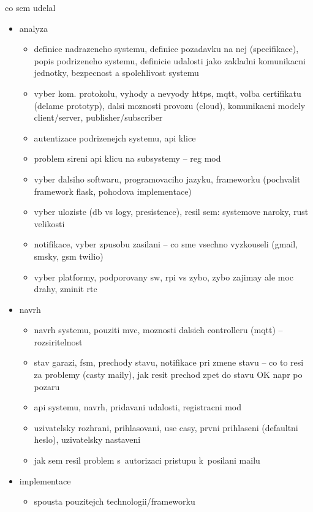 co sem udelal

\begin{itemize}
    \item analyza
    \begin{itemize}
    \item definice nadrazeneho systemu, definice pozadavku na nej (specifikace), popis podrizeneho systemu, definicie udalosti jako zakladni komunikacni jednotky, bezpecnost a spolehlivost systemu
    \item vyber kom. protokolu, vyhody a nevyody https, mqtt, volba certifikatu (delame prototyp), dalsi moznosti provozu (cloud), komunikacni modely client/server, publisher/subscriber
    \item autentizace podrizenejch systemu, api klice
    \item problem sireni api klicu na subsystemy -- reg mod
    \item vyber dalsiho softwaru, programovaciho jazyku, frameworku (pochvalit framework flask, pohodova implementace)
    \item vyber uloziste (db vs logy, presistence), resil sem: systemove naroky, rust velikosti
    \item notifikace, vyber zpusobu zasilani -- co sme vsechno vyzkouseli (gmail, smsky, gsm twilio)
    \item vyber platformy, podporovany sw, rpi vs zybo, zybo zajimay ale moc drahy, zminit rtc
    \end{itemize}
    \item navrh
    \begin{itemize}
        \item navrh systemu, pouziti mvc, moznosti dalsich controlleru (mqtt) -- rozsiritelnost
        \item stav garazi, fsm, prechody stavu, notifikace pri zmene stavu -- co to resi za problemy (casty maily), jak resit prechod zpet do stavu OK napr po pozaru
        \item api systemu, navrh, pridavani udalosti, registracni mod
        \item uzivatelsky rozhrani, prihlasovani, use casy, prvni prihlaseni (defaultni heslo), uzivatelsky nastaveni
        \item jak sem resil problem s~autorizaci pristupu k~posilani mailu
    \end{itemize}
    \item implementace
    \begin{itemize}
        \item spousta pouzitejch technologii/frameworku

\end{itemize}
\end{itemize}
